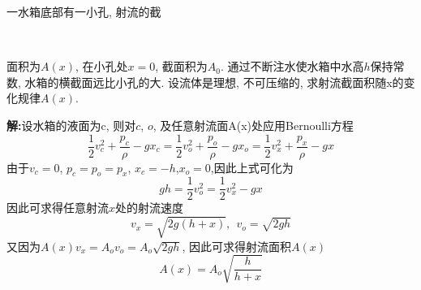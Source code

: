 \begin{problem}[问题5.2]一水箱底部有一小孔, 射流的截

\vspace{-2em}
\begin{multicols}{2}
~

面积为$A(x)$, 在小孔处$x=0$, 截面积为$A_0$. 通过不断注水使水箱中水高$h$保持常数, 水箱的横截面远比小孔的大. 设流体是理想, 不可压缩的, 求射流截面积随x的变化规律$A(x)$.
\begin{center}

\end{center}
\end{multicols}
\end{problem}

\begin{solution}
\textbf{解:}设水箱的液面为c, 则对$c$, $o$, 及任意射流面A(x)处应用Bernoulli方程
\[
\frac{1}{2}v_c^2 + \frac{p_c}{\rho} - gx_c =
\frac{1}{2}v_o^2 + \frac{p_o}{\rho} - gx_o =
\frac{1}{2}v_x^2 + \frac{p_x}{\rho} - gx
\]
由于$v_c=0$, $p_c = p_o = p_x$, $x_c=-h$,$x_o = 0$,因此上式可化为
\[
gh = \frac{1}{2}v_o^2 = \frac{1}{2}v_x^2 -gx
\]
因此可求得任意射流$x$处的射流速度
\[
v_x = \sqrt{2g(h+x)} , {~~} v_o = \sqrt{2gh}
\]
又因为$A(x)v_x = A_ov_o=A_o\sqrt{2gh}$, 因此可求得射流面积$A(x)$
\[
A(x) = A_o\sqrt{\frac{h}{h+x}}
\]
\end{solution} 
